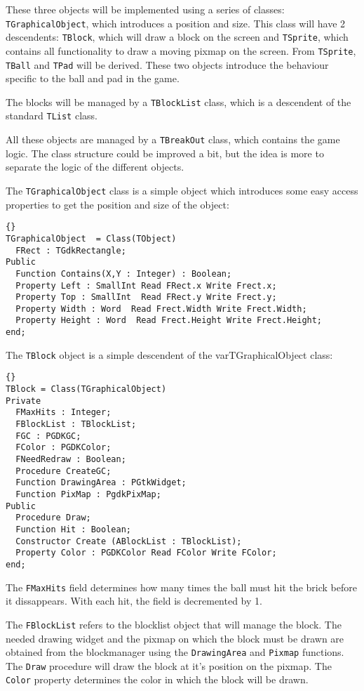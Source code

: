 \documentclass[10pt]{article}
\newcommand{\var}[1]{\texttt{#1}}
\begin{document}
These three objects will be implemented using a series of classes:
\var{TGraphicalObject}, which introduces a position and size. This class
will have 2 descendents: \var{TBlock}, which will draw a block on the
screen and \var{TSprite}, which contains all functionality to draw a moving
pixmap on the screen. From \var{TSprite}, \var{TBall} and \var{TPad} will be
derived. These two objects introduce the behaviour specific to the ball and
pad in the game.

The blocks will be managed by a \var{TBlockList} class, which is a
descendent of the standard \var{TList} class. 

All these objects are managed by a \var{TBreakOut} class, which contains the
game logic. The class structure could be improved a bit, but the idea is
more to separate the logic of the different objects.

The \var{TGraphicalObject} class is a simple object which introduces some 
easy access properties to get the position and size of the object:
\begin{lstlisting}{}
TGraphicalObject  = Class(TObject)
  FRect : TGdkRectangle;
Public 
  Function Contains(X,Y : Integer) : Boolean;
  Property Left : SmallInt Read FRect.x Write Frect.x;
  Property Top : SmallInt  Read FRect.y Write Frect.y;
  Property Width : Word  Read Frect.Width Write Frect.Width;
  Property Height : Word  Read Frect.Height Write Frect.Height;
end;
\end{lstlisting}{}

The \var{TBlock} object is a simple descendent of the var{TGraphicalObject}
class:
\begin{lstlisting}{}
TBlock = Class(TGraphicalObject)
Private
  FMaxHits : Integer;
  FBlockList : TBlockList;
  FGC : PGDKGC;
  FColor : PGDKColor;
  FNeedRedraw : Boolean;
  Procedure CreateGC;
  Function DrawingArea : PGtkWidget;
  Function PixMap : PgdkPixMap; 
Public
  Procedure Draw;
  Function Hit : Boolean;
  Constructor Create (ABlockList : TBlockList);
  Property Color : PGDKColor Read FColor Write FColor;
end;
\end{lstlisting}{}
The \var{FMaxHits} field determines how many times the ball must hit the
brick before it dissappears. With each hit, the field is decremented by 1.

The \var{FBlockList} refers to the blocklist object that will manage the 
block. The needed drawing widget and the pixmap on which the block must be
drawn are obtained from the blockmanager using the \var{DrawingArea} and 
\var{Pixmap} functions.
The \var{Draw} procedure will draw the block at it's position on the pixmap.
The \var{Color} property determines the color in which the block will be
drawn.
\end{document}
